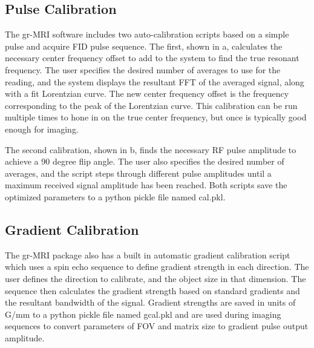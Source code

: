 \documentclass[review]{elsarticle}
\renewcommand{\textcolor}[1]{}
\begin{document}
\subsection{Pulse Calibration}\label{Pulse Calibration}


\indent The gr-MRI software includes two auto-calibration scripts based on a simple pulse and acquire FID pulse sequence.  The first, shown in a, calculates the necessary center frequency offset to add to the system to find the true resonant frequency.  The user specifies the desired number of averages to use for the reading, and the system displays the resultant FFT of the averaged signal, along with a fit Lorentzian curve.  The new center frequency offset is the frequency corresponding to the peak of the Lorentzian curve.  This calibration can be run multiple times to hone in on the true center frequency, but once is typically good enough for imaging.

The second calibration, shown in b, finds the necessary RF pulse amplitude to achieve a 90 degree flip angle.  The user also specifies the desired number of averages, and the script steps through different pulse amplitudes until a maximum received signal amplitude has been reached.  Both scripts save the optimized parameters to a python pickle file named cal.pkl.

\subsection{Gradient Calibration}\label{Gradient Calibration}

\indent The gr-MRI package also has a built in automatic gradient calibration script which uses a spin echo sequence to define gradient strength in each direction.  The user defines the direction to calibrate, and the object size in that dimension. The sequence then calculates the gradient strength based on standard gradients and the resultant bandwidth of the signal.  Gradient strengths are saved in units of G/mm to a python pickle file named gcal.pkl and are used during imaging sequences to convert parameters of FOV and matrix size to gradient pulse output amplitude.
\end{document}
